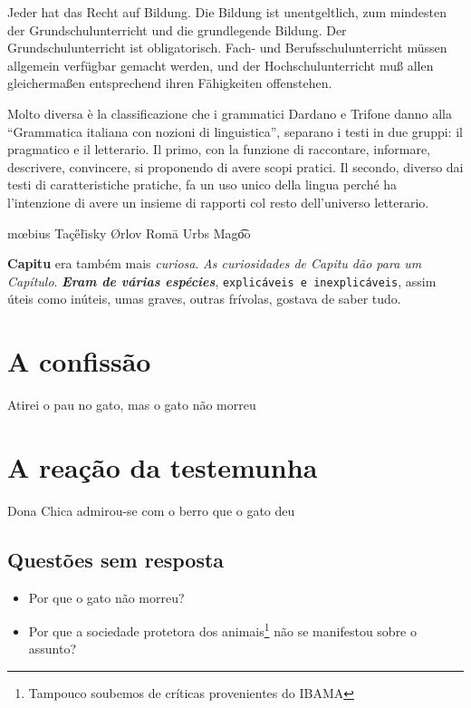 \documentclass[11pt]{article}
\begin{document}

Jeder hat das Recht auf Bildung. Die Bildung ist unentgeltlich, zum mindesten der
Grundschulunterricht und die grundlegende Bildung. Der Grundschulunterricht ist
obligatorisch. Fach- und Berufsschulunterricht müssen allgemein verfügbar gemacht
werden, und der Hochschulunterricht muß allen gleichermaßen entsprechend ihren
Fähigkeiten offenstehen.

\par Molto diversa è la classificazione che i grammatici Dardano e Trifone danno alla
``Grammatica italiana con nozioni di linguistica'', separano i testi in due gruppi:
il pragmatico e il letterario. Il primo, con la funzione di raccontare, informare,
descrivere, convincere, si proponendo di avere scopi pratici. Il secondo, diverso dai
testi di caratteristiche pratiche, fa un uso unico della lingua perché ha l'intenzione
di avere un insieme di rapporti col resto dell'universo letterario.

m\oe bius
Ta\c c\H e\l\=\i sky
\O rlov
Rom\=a Urbs
Mag\t{oo}


\par {\bf Capitu} era também mais {\it curiosa}. {\sl As curiosidades
de {\rm Capitu} dão para {\Huge um} Capítulo}. \textbf{\textit{Eram de várias
espécies}}, {\tt explicáveis e inexplicáveis}, {\sf assim úteis como
inúteis}, umas graves, outras frívolas, gostava de saber tudo.


\section{A confissão}
Atirei o pau no gato, mas o gato não morreu

\section{A reação da testemunha}
Dona Chica admirou-se com o berro que o gato deu

\subsection{Questões sem resposta}
\begin{itemize}
    \item Por que o gato não morreu?
    \item Por que a sociedade protetora dos animais\footnote{Tampouco soubemos
          de críticas provenientes do IBAMA} não se manifestou sobre o assunto?
\end{itemize}
\end{document}
